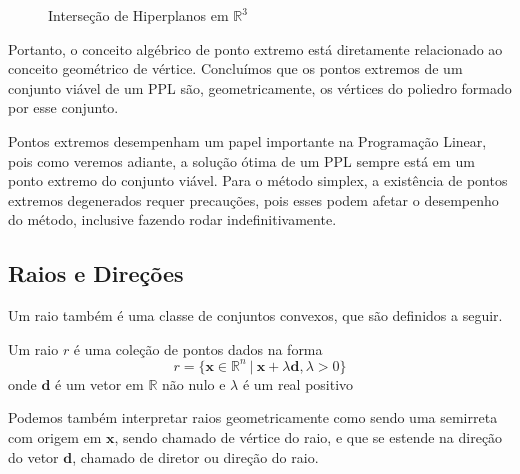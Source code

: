 \begin{itemize}
\begin{figure}[H]
	\caption{Interseção de Hiperplanos em $\mathbb{R}^3$}
	\end{figure}
\end{itemize}

Portanto, o conceito algébrico de ponto extremo está diretamente relacionado ao conceito geométrico de vértice. Concluímos que os pontos extremos de um conjunto viável de um PPL são, geometricamente, os vértices do poliedro formado por esse conjunto.
     

Pontos extremos desempenham um papel importante na Programação Linear, pois como veremos adiante, a solução ótima de um PPL sempre está em um ponto extremo do conjunto viável. Para o método simplex, a existência de pontos extremos degenerados requer precauções, pois esses podem afetar o desempenho do método, inclusive fazendo rodar indefinitivamente.   

\subsection{Raios e Direções}

Um raio também é uma classe de conjuntos convexos, que são definidos a seguir.

\begin{def:raio}
	Um raio $r$ é uma coleção de pontos dados na forma
	\begin{equation*}
		r = \{\mathbf{x} \in \mathbb{R}^n \ |\  \mathbf{x} + \lambda \mathbf{d}, \lambda > 0\}
	\end{equation*}
	onde $\mathbf{d}$ é um vetor em $\mathbb{R}$ não nulo e $\lambda$ é um real positivo
\end{def:raio}

Podemos também interpretar raios geometricamente como sendo uma semirreta com origem em $\mathbf{x}$, sendo chamado de vértice do raio, e que se estende na direção do vetor $\mathbf{d}$, chamado de diretor ou direção do raio.

